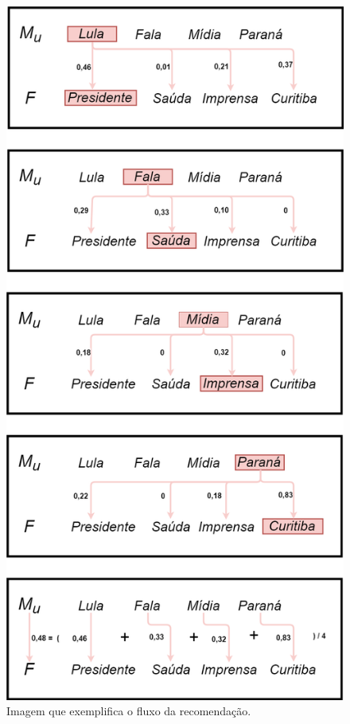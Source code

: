 \begin{figure}
	\centering
	\includegraphics[scale=0.32]{imagens/rlws_ex.png}
	\caption{Imagem que exemplifica o fluxo da recomendação.}
	\label{fig:rlws_ex}
\end{figure}

